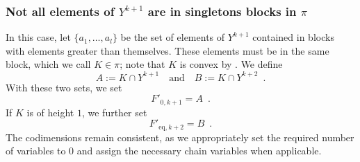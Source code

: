 \documentclass[12pt,a4paper]{amsart}
\theoremstyle{definition}
\begin{document}
\subsubsection{Not all elements of $Y^{{k+1}}$ are in singletons blocks in $\pi$}\label{Case-Gen-Non-Single}
In this case, let $\{a_1,\dots, a_l\}$ be the set of elements of $Y^{{k+1}}$ contained in blocks with elements greater than themselves. 
These elements must be in the same block, which we call $K\in\pi$; note that $K$ is convex by \cite[Remark 3.8]{Peg18}.
We define
\begin{equation}\label{Eq-Min-Block-Decomp}
    A:=K\cap Y^{k+1} \quad \text{and} \quad B:=K\cap Y^{k+2} \enspace .
\end{equation}
With these two sets, we set
\begin{equation*}
  F'_{0,k+1}=A \enspace.
\end{equation*}
If $K$ is of height $1$, we further set
\begin{equation*}
  F'_{\mathrm{eq},k+2}=B \enspace .
\end{equation*}
The codimensions remain consistent, as we appropriately set the required number of variables to 0 and assign the necessary chain variables when applicable.
\end{document}
